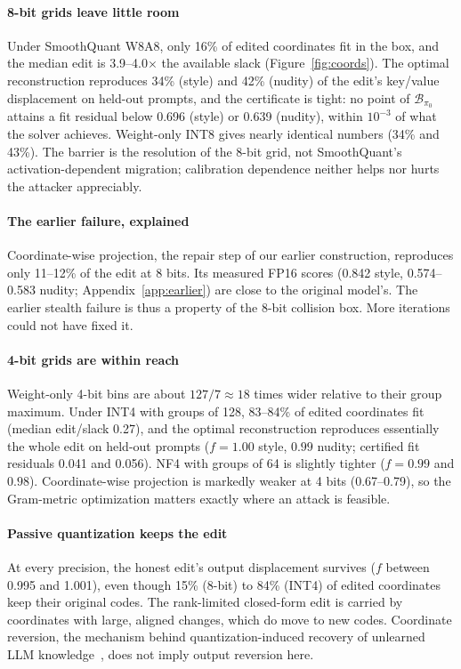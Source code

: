 \paragraph{8-bit grids leave little room}
Under SmoothQuant W8A8, only 16\% of edited coordinates fit in the box, and the
median edit is 3.9--4.0$\times$ the available slack (Figure~\ref{fig:coords}). The
optimal reconstruction reproduces 34\% (style) and 42\% (nudity) of the edit's
key/value displacement on held-out prompts, and the certificate is tight: no point of
$\mathcal{B}_{\pi_0}$ attains a fit residual below 0.696 (style) or 0.639 (nudity),
within $10^{-3}$ of what the solver achieves. Weight-only INT8 gives nearly identical numbers (34\% and 43\%). The barrier
is the resolution of the 8-bit grid, not SmoothQuant's activation-dependent
migration; calibration dependence neither helps nor hurts the attacker appreciably.

\paragraph{The earlier failure, explained}
Coordinate-wise projection, the repair step of our earlier construction, reproduces
only 11--12\% of the edit at 8 bits. Its measured FP16 scores (0.842 style, 0.574--0.583
nudity; Appendix~\ref{app:earlier}) are close to the original model's. The earlier
stealth failure is thus a property of the 8-bit collision box. More iterations could
not have fixed it.

\paragraph{4-bit grids are within reach}
Weight-only 4-bit bins are about $127/7\approx18$ times wider relative to their
group maximum. Under INT4 with groups of 128, 83--84\% of edited coordinates fit
(median edit/slack 0.27), and the optimal reconstruction reproduces essentially the whole
edit on held-out prompts ($f=1.00$ style, $0.99$ nudity; certified fit residuals
0.041 and 0.056). NF4 with groups of 64 is slightly tighter ($f=0.99$ and $0.98$).
Coordinate-wise projection is markedly weaker at 4 bits (0.67--0.79), so the
Gram-metric optimization matters exactly where an attack is feasible.

\paragraph{Passive quantization keeps the edit}
At every precision, the honest edit's output displacement survives
($f$ between 0.995 and 1.001), even though 15\% (8-bit) to 84\% (INT4) of edited
coordinates keep their original codes. The rank-limited closed-form edit is carried
by coordinates with large, aligned changes, which do move to new codes. Coordinate
reversion, the mechanism behind quantization-induced recovery of unlearned LLM
knowledge~\cite{zhang2025}, does not imply output reversion here.

